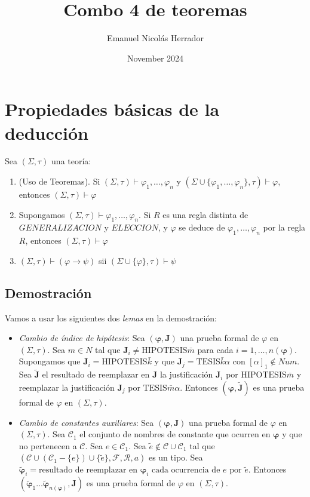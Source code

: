 \documentclass{article}
\title{Combo 4 de teoremas}
\author{Emanuel Nicolás Herrador}
\date{November 2024}
\begin{document}
\maketitle

\section*{Propiedades básicas de la deducción}
Sea $(\Sigma,\tau)$ una teoría:
\begin{enumerate}
  \item (Uso de Teoremas). Si $(\Sigma,\tau)\vdash\varphi_1,\dots,\varphi_n$ y $(\Sigma\cup\{\varphi_1,\dots,\varphi_n\},\tau)\vdash\varphi$, entonces $(\Sigma,\tau)\vdash\varphi$
  \item Supongamos $(\Sigma,\tau)\vdash\varphi_1,\dots,\varphi_n$. Si $R$ es una regla distinta de $GENERALIZACION$ y $ELECCION$, y $\varphi$ se deduce de $\varphi_1,\dots,\varphi_n$ por la regla $R$, entonces $(\Sigma,\tau)\vdash\varphi$
  \item $(\Sigma,\tau)\vdash(\varphi\to\psi)$ sii $(\Sigma\cup\{\varphi\},\tau)\vdash\psi$
\end{enumerate}
\subsection*{Demostración}
Vamos a usar los siguientes dos \textit{lemas} en la demostración:
\begin{itemize}
  \item \textit{Cambio de índice de hipótesis}: Sea $(\boldsymbol{\varphi},\mathbf{J})$ una prueba formal de $\varphi$ en $(\Sigma,\tau)$. Sea $m\in N$ tal que $\mathbf{J}_i\neq\text{HIPOTESIS}\bar{m}$ para cada $i=1,\dots,n(\boldsymbol{\varphi})$. Supongamos que $\mathbf{J}_i=\text{HIPOTESIS}\bar{k}$ y que $\mathbf{J}_j=\text{TESIS}\bar{k}\alpha$ con $[\alpha]_1\notin Num$. Sea $\tilde{\mathbf{J}}$ el resultado de reemplazar en $\mathbf{J}$ la justificación $\mathbf{J}_i$ por $\text{HIPOTESIS}\bar{m}$ y reemplazar la justificación $\mathbf{J}_j$ por $\text{TESIS}\bar{m}\alpha$. Entonces $(\boldsymbol{\varphi},\tilde{\mathbf{J}})$ es una prueba formal de $\varphi$ en $(\Sigma,\tau)$.
  \item \textit{Cambio de constantes auxiliares}: Sea $(\boldsymbol{\varphi},\mathbf{J})$ una prueba formal de $\varphi$ en $(\Sigma,\tau)$. Sea $\mathcal{C}_1$ el conjunto de nombres de constante que ocurren en $\boldsymbol{\varphi}$ y que no pertenecen a $\mathcal{C}$. Sea $e\in\mathcal{C}_1$. Sea $\tilde{e}\notin\mathcal{C}\cup\mathcal{C}_1$ tal que $(\mathcal{C}\cup(\mathcal{C}_1-\{e\})\cup\{\tilde{e}\},\mathcal{F},\mathcal{R},a)$ es un tipo. Sea $\tilde{\boldsymbol{\varphi}}_i=\text{resultado de reemplazar en }\boldsymbol{\varphi}_i\text{ cada ocurrencia de }e\text{ por }\tilde{e}$. Entonces $(\tilde{\boldsymbol{\varphi}}_1\dots\tilde{\boldsymbol{\varphi}}_{n(\boldsymbol{\varphi})},\mathbf{J})$ es una prueba formal de $\varphi$ en $(\Sigma,\tau)$.
\end{itemize}
\end{document}
